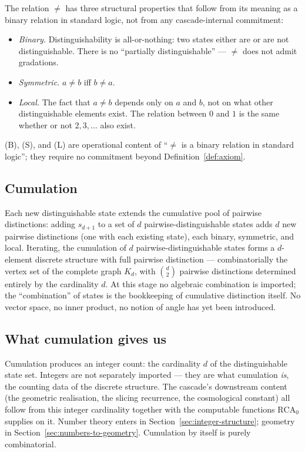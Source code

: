 \documentclass[11pt,a4paper]{article}
\begin{document}
The relation $\neq$ has three structural properties that follow from
its meaning as a binary relation in standard logic, not from any
cascade-internal commitment:
\begin{itemize}
\item[(B)] \emph{Binary.} Distinguishability is all-or-nothing: two
states either are or are not distinguishable. There is no
``partially distinguishable'' --- $\neq$ does not admit gradations.
\item[(S)] \emph{Symmetric.} $a \neq b$ iff $b \neq a$.
\item[(L)] \emph{Local.} The fact that $a \neq b$ depends only on
$a$ and $b$, not on what other distinguishable elements exist. The
relation between $0$ and $1$ is the same whether or not $2, 3,
\ldots$ also exist.
\end{itemize}

(B), (S), and (L) are operational content of ``$\neq$ is a binary
relation in standard logic''; they require no commitment beyond
Definition~\ref{def:axiom}.

\subsection*{Cumulation}

Each new distinguishable state extends the cumulative pool of
pairwise distinctions: adding $s_{d+1}$ to a set of $d$
pairwise-distinguishable states adds $d$ new pairwise distinctions
(one with each existing state), each binary, symmetric, and local.
Iterating, the cumulation of $d$ pairwise-distinguishable states
forms a $d$-element discrete structure with full pairwise distinction
--- combinatorially the vertex set of the complete graph $K_d$, with
$\binom{d}{2}$ pairwise distinctions determined entirely by the
cardinality $d$. At this stage no algebraic combination is imported;
the ``combination'' of states is the bookkeeping of cumulative
distinction itself. No vector space, no inner product, no notion of
angle has yet been introduced.

\subsection*{What cumulation gives us}

Cumulation produces an integer count: the cardinality $d$ of the
distinguishable state set. Integers are not separately imported ---
they are what cumulation \emph{is}, the counting data of the discrete
structure. The cascade's downstream content (the geometric
realisation, the slicing recurrence, the cosmological constant) all
follow from this integer cardinality together with the computable
functions $\mathrm{RCA}_0$ supplies on it. Number theory enters in
Section~\ref{sec:integer-structure}; geometry in
Section~\ref{sec:numbers-to-geometry}. Cumulation by itself is purely
combinatorial.
\end{document}
